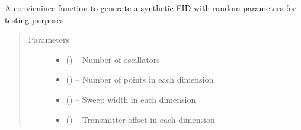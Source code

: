 \documentclass[letterpaper,10pt,english]{sphinxmanual}
\begin{document}
\begin{fulllineitems}
\label{\detokenize{references/sig:nmrespy.sig.generate_random_signal}}
\sphinxAtStartPar
A convienince function to generate a synthetic FID with random
parameters for testing purposes.
\begin{quote}\begin{description}
\item[{Parameters}] \leavevmode\begin{itemize}
\item {} 
\sphinxAtStartPar
{} () – Number of oscillators

\item {} 
\sphinxAtStartPar
{} (\sphinxstyleliteralemphasis{\sphinxupquote{{[}}}\sphinxstyleliteralemphasis{\sphinxupquote{{]} or }}\sphinxstyleliteralemphasis{\sphinxupquote{{[}}}\sphinxstyleliteralemphasis{\sphinxupquote{, }}\sphinxstyleliteralemphasis{\sphinxupquote{{]}}}) – Number of points in each dimension

\item {} 
\sphinxAtStartPar
{} (\sphinxstyleliteralemphasis{\sphinxupquote{{[}}}\sphinxstyleliteralemphasis{\sphinxupquote{{]} or }}\sphinxstyleliteralemphasis{\sphinxupquote{{[}}}\sphinxstyleliteralemphasis{\sphinxupquote{, }}\sphinxstyleliteralemphasis{\sphinxupquote{{]}}}) – Sweep width in each dimension

\item {} 
\sphinxAtStartPar
{} (\sphinxstyleliteralemphasis{\sphinxupquote{{[}}}\sphinxstyleliteralemphasis{\sphinxupquote{{]}}}\sphinxstyleliteralemphasis{\sphinxupquote{, }}\sphinxstyleliteralemphasis{\sphinxupquote{{[}}}\sphinxstyleliteralemphasis{\sphinxupquote{, }}\sphinxstyleliteralemphasis{\sphinxupquote{{]} or }}\sphinxstyleliteralemphasis{\sphinxupquote{, }}) – Transmitter offset in each dimension


\end{itemize}
\end{description}
\end{quote}
\end{fulllineitems}
\end{document}
